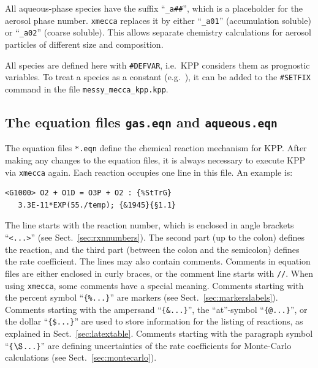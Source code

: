 \documentclass[twoside]{article}
\begin{document}
All aqueous-phase species have the suffix ``\verb|_a##|'', which is a
placeholder for the aerosol phase number. \verb|xmecca| replaces it by
either ``\verb|_a01|'' (accumulation soluble) or ``\verb|_a02|'' (coarse
soluble). This allows separate chemistry calculations for aerosol
particles of different size and composition.

All species are defined here with \verb|#DEFVAR|, i.e.\ KPP considers
them as prognostic variables. To treat a species as a constant (e.g.\ 
), it can be added to the \verb|#SETFIX| command in the file
\verb|messy_mecca_kpp.kpp|.

\subsection{The equation files {\tt gas.eqn} and {\tt aqueous.eqn}}
\label{sec:eqnfiles}

The equation files \verb|*.eqn| define the chemical reaction mechanism
for KPP. After making any changes to the equation files, it is always
necessary to execute KPP via \verb|xmecca| again. Each reaction occupies
one line in this file. An example is:

\begin{verbatim}
<G1000> O2 + O1D = O3P + O2 : {%StTrG}
   3.3E-11*EXP(55./temp); {&1945}{§1.1}
\end{verbatim}

The line starts with the reaction number, which is enclosed in angle
brackets ``\verb|<...>|'' (see Sect.~\ref{sec:rxnnumbers}). The second
part (up to the colon) defines the reaction, and the third part (between
the colon and the semicolon) defines the rate coefficient. The lines may
also contain comments. Comments in equation files are either enclosed in
curly braces, or the comment line starts with \verb|//|. When using
\verb|xmecca|, some comments have a special meaning. Comments starting
with the percent symbol ``\verb|{%...}|''
  are markers (see Sect.~\ref{sec:markerslabels}). Comments starting
  with the ampersand ``\verb|{&...}|'', the ``at''-symbol
  ``\verb|{@...}|'', or the dollar ``\verb|{$...}|'' are used to store
  information for the listing of reactions, as explained in
  Sect.~\ref{sec:latextable}. Comments starting with the paragraph
  symbol ``\verb|{|$\S$\verb|...}|'' are defining uncertainties of the
  rate coefficients for Monte-Carlo calculations (see
  Sect.~\ref{sec:montecarlo}).
\end{document}
